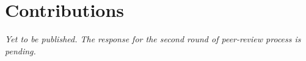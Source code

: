
\chapter{Contributions}
\label{chap:contributions}


\label{chap:maha}

\onlineomit{}



\label{chap:embedsom}

\onlineomit{}



\label{chap:cross-corr}

\emph{Yet to be published. The response for the second round of peer-review process is pending.}
\onlineomit{}



\label{chap:maboss}

\onlineomit{}



\label{chap:noarr-l}

\onlineomit{}



\label{chap:noarr-t}

\onlineomit{}